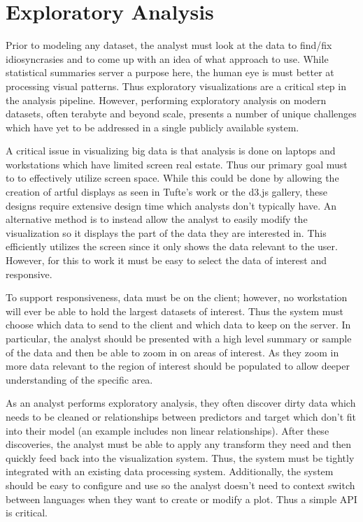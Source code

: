 \documentclass[letter,twocolumn]{article}
\begin{document}
\section{Exploratory Analysis}

Prior to modeling any dataset, the analyst must look at the data to find/fix idiosyncrasies and to come up with an idea of what approach to use.
While statistical summaries server a purpose here, the human eye is must better at processing visual patterns.
Thus exploratory visualizations are a critical step in the analysis pipeline.
However, performing exploratory analysis on modern datasets, often terabyte and beyond scale, presents a number of unique challenges which have yet to be addressed in a single publicly available system.

A critical issue in visualizing big data is that analysis is done on laptops and workstations which have limited screen real estate.
Thus our primary goal must to to effectively utilize screen space.
While this could be done by allowing the creation of artful displays as seen in Tufte's work\cite{Tufte:1986:VDQ:33404} or the d3.js gallery\cite{d3galery}, these designs require extensive design time which analysts don't typically have.
An alternative method is to instead allow the analyst to easily modify the visualization so it displays the part of the data they are interested in.
This efficiently utilizes the screen since it only shows the data relevant to the user.
However, for this to work it must be easy to select the data of interest and responsive.

To support responsiveness, data must be on the client; however, no workstation will ever be able to hold the largest datasets of interest.
Thus the system must choose which data to send to the client and which data to keep on the server.
In particular, the analyst should be presented with a high level summary or sample of the data and then be able to zoom in on areas of interest.
As they zoom in more data relevant to the region of interest should be populated to allow deeper understanding of the specific area.

As an analyst performs exploratory analysis, they often discover dirty data which needs to be cleaned or relationships between predictors and target which don't fit into their model (an example includes non linear relationships).
After these discoveries, the analyst must be able to apply any transform they need and then quickly feed back into the visualization system.
Thus, the system must be tightly integrated with an existing data processing system.
Additionally, the system should be easy to configure and use so the analyst doesn't need to context switch between languages when they want to create or modify a plot.
Thus a simple API is critical.
\end{document}
